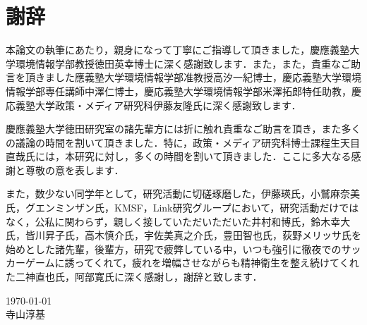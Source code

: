 \chapter*{謝辞}
本論文の執筆にあたり，親身になって丁寧にご指導して頂きました，慶應義塾大学環境情報学部教授徳田英幸博士に深く感謝致します．また，また，貴重なご助言を頂きました應義塾大学環境情報学部准教授高汐一紀博士，慶応義塾大学環境情報学部専任講師中澤仁博士，慶応義塾大学環境情報学部米澤拓郎特任助教，慶応義塾大学政策・メディア研究科伊藤友隆氏に深く感謝致します．

慶應義塾大学徳田研究室の諸先輩方には折に触れ貴重なご助言を頂き，また多くの議論の時間を割いて頂きました．特に，政策・メディア研究科博士課程生天目直哉氏には，本研究に対し，多くの時間を割いて頂きました．ここに多大なる感謝と尊敬の意を表します．

また，数少ない同学年として，研究活動に切磋琢磨した，伊藤瑛氏，小鷲麻奈美氏，グエンミンザン氏，KMSF，Link研究グループにおいて，研究活動だけではなく，公私に関わらず，親しく接していただいただいた井村和博氏，鈴木幸大氏，皆川昇子氏，高木慎介氏，宇佐美真之介氏，豊田智也氏，荻野メリッサ氏を始めとした諸先輩，後輩方，研究で疲弊している中，いつも強引に徹夜でのサッカーゲームに誘ってくれて，疲れを増幅させながらも精神衛生を整え続けてくれた二神直也氏，阿部寛氏に深く感謝し，謝辞と致します．

\begin{flushright}
\today\\
寺山淳基
\end{flushright}
